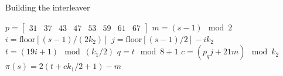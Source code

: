\documentclass[xcolor={usenames,dvipsnames},11pt]{beamer}
\begin{document}
\begin{frame}{Building the interleaver}
    \begin{algorithmic}
        \State $p = \begin{bmatrix}31 & 37 & 43 & 47 & 53 & 59 & 61 & 67\end{bmatrix}$
            \State $m = (s-1) \mod 2$
            \State $i = \text{floor}\left[(s-1)/(2k_2)\right]$
            \State $j = \text{floor}\left[(s-1)/2\right] -i k_2$
            \State $t = (19i + 1) \mod (k_1/2)$
            \State $q = t \mod 8 + 1$
            \State $c = (p_q j + 21m) \mod k_2$
            \State $\pi(s) = 2(t + c k_1/2 +1) - m$
        \EndFor
    \end{algorithmic}
\end{frame}
\end{document}
